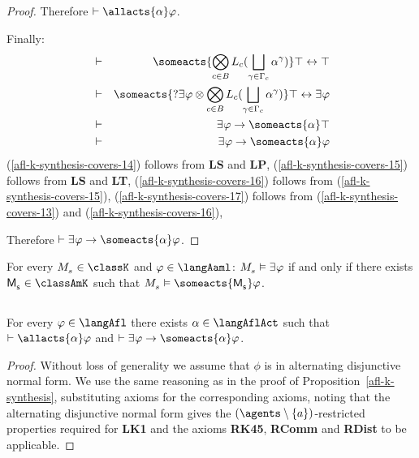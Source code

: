 \begin{proof}
Therefore $\proves \allacts{\alpha} \phi$.

Finally:
\begin{eqnarray}
&\proves& \someacts{\bigcompose_{\agentC \in \agentsB} \learns_\agentC (\bigchoice_{\gamma \in \Gamma_\agentC} \alpha^\gamma)} \top \iff \top\label{afl-k-synthesis-covers-14}\\
&\proves& \someacts{\test{\somerefs \phi} \compose \bigcompose_{\agentC \in \agentsB} \learns_\agentC (\bigchoice_{\gamma \in \Gamma_\agentC} \alpha^\gamma)} \top \iff \somerefs \phi\label{afl-k-synthesis-covers-15}\\
&\proves& \somerefs \phi \implies \someacts{\alpha} \top\label{afl-k-synthesis-covers-16}\\
&\proves& \somerefs \phi \implies \someacts{\alpha} \phi\label{afl-k-synthesis-covers-17}
\end{eqnarray}
(\ref{afl-k-synthesis-covers-14}) follows from {\bf LS} and {\bf LP},
(\ref{afl-k-synthesis-covers-15}) follows from {\bf LS} and {\bf LT},
(\ref{afl-k-synthesis-covers-16}) follows from (\ref{afl-k-synthesis-covers-15}),
(\ref{afl-k-synthesis-covers-17}) follows from (\ref{afl-k-synthesis-covers-13}) and (\ref{afl-k-synthesis-covers-16}),

Therefore $\proves \somerefs \phi \implies \someacts{\alpha} \phi$.
\end{proof}

\begin{corollary}
For every $\kPModel{\kStateS} \in \classK$ and $\phi \in \langAaml$: $\kPModel{\kStateS} \entails \somerefs \phi$ if and only if there exists $\aPModel{\aStateS} \in \classAmK$ such that $\kPModel{\kStateS} \entails \someacts{\aPModel{\aStateS}} \phi$.
\end{corollary}

\subsection{\classKFF{}}

\begin{proposition}\label{afl-kff-synthesis}
For every $\phi \in \langAfl$ there exists $\alpha \in \langAflAct$ such that $\proves \allacts{\alpha} \phi$ and $\proves \somerefs \phi \implies \someacts{\alpha} \phi$.
\end{proposition} 

\begin{proof}
Without loss of generality we assume that $\phi$ is in alternating disjunctive normal form.
We use the same reasoning as in the proof of Proposition~\ref{afl-k-synthesis}, substituting \axiomAflKFF{} axioms for the corresponding \axiomAflK{} axioms, noting that the alternating disjunctive normal form gives the $(\agents \setminus \{\agentA\})$-restricted properties required for {\bf LK1} and the \axiomRmlKFF{} axioms {\bf RK45}, {\bf RComm} and  {\bf RDist} to be applicable.
\end{proof}

